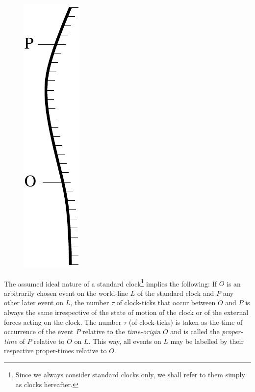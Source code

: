 \begin{small}
\newpage

\begin{figure}[H]
\centering
\includegraphics[scale=.5]{src/images/lbk-graphics/str5.pdf}
\caption*{}
\end{figure}

The assumed ideal nature of a standard clock\footnote{Since 
we always consider standard clocks only, we shall refer to 
them simply as clocks hereafter.} implies the following: If 
$O$ is an arbitrarily chosen event on the world-line $L$ of 
the standard clock and $P$ any other later event on $L$, 
the 
number $\tau$ of clock-ticks that occur between $O$ and $P$ 
is always the same irrespective of the state of motion of 
the clock or of the external forces acting on the clock. 
The 
number $\tau$ (of clock-ticks) is taken as the time of 
occurrence of the event $P$ relative to the 
\textsl{time-origin} $O$ and is called the 
\textsl{proper-time} of $P$ relative to $O$ on $L$. This 
way, all events on $L$ may be labelled by their respective 
proper-times relative to $O$. 

\end{small}
